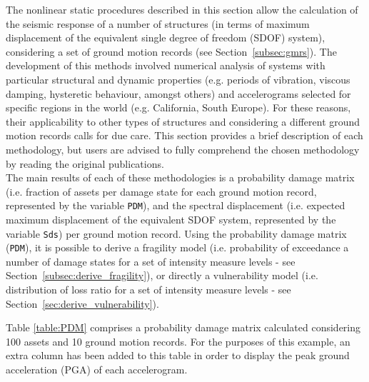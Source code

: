 The nonlinear static procedures described in this section allow the calculation of the seismic response of a number of structures (in terms of maximum displacement of the equivalent single degree of freedom (SDOF) system), considering a set of ground motion records (see Section~\ref{subsec:gmrs}). The development of this methods involved numerical analysis of systems with particular structural and dynamic properties (e.g. periods of vibration, viscous damping, hysteretic behaviour, amongst others) and accelerograms selected for specific regions in the world (e.g. California, South Europe). For these reasons, their applicability to other types of structures and considering a different ground motion records calls for due care. This section provides a brief description of each methodology, but users are advised to fully comprehend the chosen methodology by reading the original publications. \\

The main results of each of these methodologies is a probability damage matrix (i.e. fraction of assets per damage state for each ground motion record, represented by the variable \verb=PDM=), and the spectral displacement (i.e. expected maximum displacement of the equivalent SDOF system, represented by the variable \verb=Sds=) per ground motion record. Using the probability damage matrix (\verb=PDM=), it is possible to derive a fragility model (i.e. probability of exceedance a number of damage states for a set of intensity measure levels - see Section~\ref{subsec:derive_fragility}), or directly a vulnerability model (i.e. distribution of loss ratio for a set of intensity measure levels - see Section~\ref{sec:derive_vulnerability}).

Table \ref{table:PDM} comprises a probability damage matrix calculated considering 100 assets and 10 ground motion records. For the purposes of this example, an extra column has been added to this table in order to display the peak ground acceleration (PGA) of each accelerogram.

